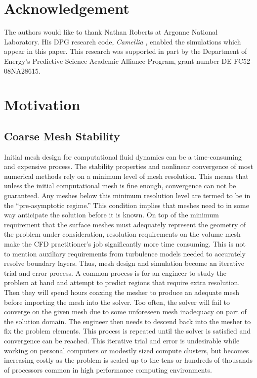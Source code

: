 \documentclass[preprint,12pt]{elsarticle}
\begin{document}

\section*{Acknowledgement}
The authors would like to thank Nathan Roberts at Argonne National Laboratory. 
His DPG research code, \emph{Camellia} \cite{CamelliaDPG}, enabled the simulations which appear in this paper.
This research was supported in part by the Department of Energy's Predictive Science Academic Alliance Program, grant number DE-FC52-08NA28615.

\section{Motivation}
\subsection{Coarse Mesh Stability}
Initial mesh design for computational fluid dynamics can be a time-consuming and expensive process. 
The stability properties and nonlinear convergence of most numerical methods rely on a minimum level of mesh resolution. 
This means that unless the initial computational mesh is fine enough, convergence can not be guaranteed. 
Any meshes below this minimum resolution level are termed to be in the ``pre-asymptotic regime.'' 
This condition implies that meshes need to in some way anticipate the solution before it is known. 
On top of the minimum requirement that the surface meshes must adequately represent the geometry of the problem under consideration, 
resolution requirements on the volume mesh make the CFD practitioner's job significantly more time consuming. 
This is not to mention auxiliary requirements from turbulence models needed to accurately resolve boundary layers. 
Thus, mesh design and simulation become an iterative trial and error process.
A common process is for an engineer to study the problem at hand and attempt to predict regions that require extra resolution. 
Then they will spend hours coaxing the mesher to produce an adequate mesh before importing the mesh into the solver.
Too often, the solver will fail to converge on the given mesh due to some unforeseen mesh inadequacy on part of the solution domain.
The engineer then needs to descend back into the mesher to fix the problem elements.
This process is repeated until the solver is satisfied and convergence can be reached.
This iterative trial and error is undesirable while working on personal computers or modestly sized compute clusters, 
but becomes increasing costly as the problem is scaled up to the tens or hundreds of thousands of processors common in high performance computing environments.
\end{document}
